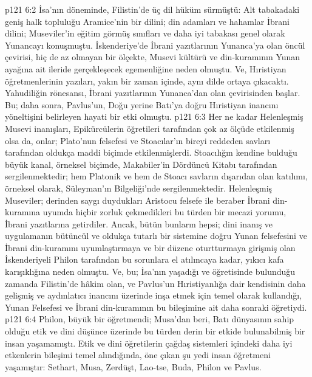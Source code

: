 \vs p121 6:2 İsa’nın döneminde, Filistin’de üç dil hüküm sürmüştü: Alt tabakadaki geniş halk topluluğu Aramice’nin bir dilini; din adamları ve hahamlar İbrani dilini; Museviler’in eğitim görmüş sınıfları ve daha iyi tabakası genel olarak Yunancayı konuşmuştu. İskenderiye’de İbrani yazıtlarının Yunanca’ya olan öncül çevirisi, hiç de az olmayan bir ölçekte, Musevi kültürü ve din\hyp{}kuramının Yunan ayağına ait ileride gerçekleşecek egemenliğine neden olmuştu. Ve, Hıristiyan öğretmenlerinin yazıları, yakın bir zaman içinde, aynı dilde ortaya çıkacaktı. Yahudiliğin rönesansı, İbrani yazıtlarının Yunanca’dan olan çevirisinden başlar. Bu; daha sonra, Pavlus’un, Doğu yerine Batı’ya doğru Hıristiyan inancını yöneltişini belirleyen hayati bir etki olmuştu.
\vs p121 6:3 Her ne kadar Helenleşmiş Musevi inanışları, Epikürcülerin öğretileri tarafından çok az ölçüde etkilenmiş olsa da, onlar; Plato’nun felsefesi ve Stoacılar’ın bireyi reddeden savları tarafından oldukça maddi biçimde etkilenmişlerdi. Stoacılığın kendine bulduğu büyük kanal, örneksel biçimde, Makabiler’in Dördüncü Kitabı tarafından sergilenmektedir; hem Platonik ve hem de Stoacı savların dışarıdan olan katılımı, örneksel olarak, Süleyman’ın Bilgeliği’nde sergilenmektedir. Helenleşmiş Museviler; derinden saygı duydukları Aristocu felsefe ile beraber İbrani din\hyp{}kuramına uyumda hiçbir zorluk çekmedikleri bu türden bir mecazi yorumu, İbrani yazıtlarına getirdiler. Ancak, bütün bunların hepsi; dini inanış ve uygulamanın bütüncül ve oldukça tutarlı bir sistemine doğru Yunan felsefesini ve İbrani din\hyp{}kuramını uyumlaştırmaya ve bir düzene oturtturmaya girişmiş olan İskenderiyeli Philon tarafından bu sorunlara el atılıncaya kadar, yıkıcı kafa karışıklığına neden olmuştu. Ve, bu; İsa’nın yaşadığı ve öğretisinde bulunduğu zamanda Filistin’de hâkim olan, ve Pavlus’un Hıristiyanlığa dair kendisinin daha gelişmiş ve aydınlatıcı inancını üzerinde inşa etmek için temel olarak kullandığı, Yunan Felsefesi ve İbrani din\hyp{}kuramının bu bileşimine ait daha sonraki öğretiydi.
\vs p121 6:4 Philon, büyük bir öğretmendi; Musa’dan beri, Batı dünyasının sahip olduğu etik ve dini düşünce üzerinde bu türden derin bir etkide bulunabilmiş bir insan yaşamamıştı. Etik ve dini öğretilerin çağdaş sistemleri içindeki daha iyi etkenlerin bileşimi temel alındığında, öne çıkan şu yedi insan öğretmeni yaşamıştır: Sethart, Musa, Zerdüşt, Lao\hyp{}tse, Buda, Philon ve Pavlus.
